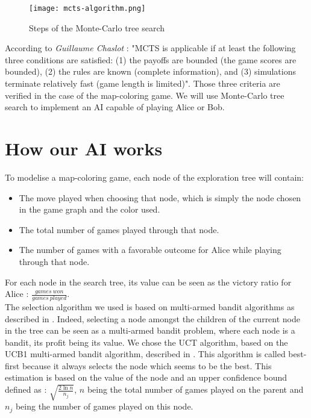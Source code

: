 \begin{figure}
\centering
\texttt{[image: mcts-algorithm.png]}
\caption{Steps of the Monte-Carlo tree search}
\label{treesearch}
\end{figure}

According to \emph{Guillaume Chaslot} \cite{ChaPHD} : "MCTS is
applicable if at least the following three conditions are satisfied: (1) the payoffs are bounded
(the game scores are bounded), (2) the rules are known (complete information), and (3) simulations terminate relatively fast (game length is limited)". Those three criteria are verified in the case of the map-coloring game. We will use Monte-Carlo tree search to implement an AI capable of playing Alice or Bob.\\

\section{How our AI works}

To modelise a map-coloring game, each node of the exploration tree will contain:
\begin{itemize}
\item The move played when choosing that node, which is simply the node chosen in the game graph and the color used.
\item The total number of games played through that node.
\item The number of games with a favorable outcome for Alice while playing through that node.
\end{itemize}
For each node in the search tree, its value can be seen as the victory ratio for Alice : $\frac{games \ won}{games \ played}$.\\

The selection algorithm we used is based on multi-armed bandit algorithms as described in \cite{MAB}. Indeed, selecting a node amongst the children of the current node in the tree can be seen as a multi-armed bandit problem, where each node is a bandit, its profit being its value. We chose the UCT algorithm, based on the UCB1 multi-armed bandit algorithm, described in \cite{ChaPHD}. This algorithm is called best-first because it always selects the node which seems to be the best. This estimation is based on the value of the node and an upper confidence bound defined as : 
$ \sqrt{\frac{2\ln{n}}{n_j}}$, $n$ being the total number of games played on the parent and $n_j$ being the number of games played on this node.\\

